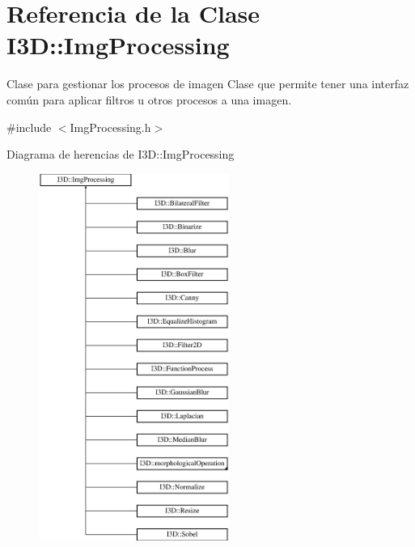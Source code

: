 \hypertarget{class_i3_d_1_1_img_processing}{}\section{Referencia de la Clase I3D\+:\+:Img\+Processing}
\label{class_i3_d_1_1_img_processing}


Clase para gestionar los procesos de imagen Clase que permite tener una interfaz común para aplicar filtros u otros procesos a una imagen.  




{\ttfamily \#include $<$Img\+Processing.\+h$>$}

Diagrama de herencias de I3D\+:\+:Img\+Processing\begin{figure}[H]
\begin{center}
\leavevmode
\includegraphics[height=12.000000cm]{class_i3_d_1_1_img_processing}
\end{center}
\end{figure}
